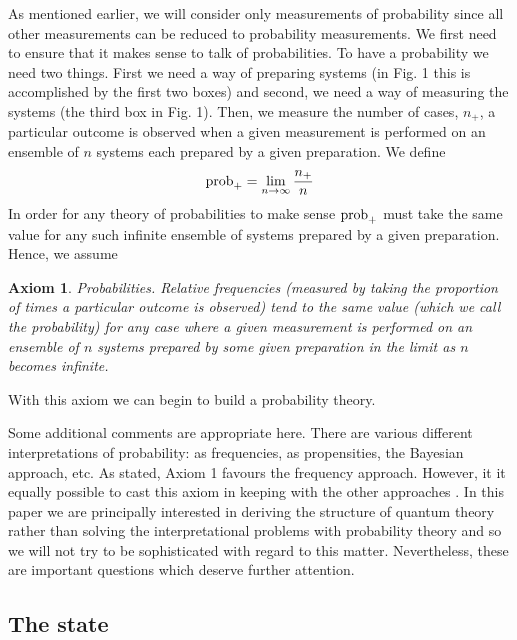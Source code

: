 \documentclass[10pt,twocolumn]{article}
\newtheorem{axiom}{Axiom}
\begin{document}
As mentioned earlier, we will consider only measurements of probability
since all other measurements can be reduced to probability measurements.
We first need to ensure that it makes sense to talk of probabilities. To
have a probability we need two things.  First we need a way of preparing
systems (in Fig. 1 this is accomplished by the first two boxes) and
second, we need a way of measuring the systems (the third box in Fig.
1).  Then, we measure the number of cases, $n_+$, a particular outcome is
observed when a given measurement is performed on an ensemble of $n$
systems each prepared by a given preparation.  We define
\begin{equation}
{\rm prob}_+ = \lim_{n\rightarrow {\rm \infty}} {n_+\over n}
\end{equation}
In order for any theory of probabilities to make sense ${\rm prob}_+$ must take the
same value for any such infinite ensemble of systems prepared by a given
preparation.  Hence, we assume

\begin{axiom} {\rm Probabilities.}  Relative frequencies
(measured by taking the proportion of times a particular outcome is observed)
tend to the same value (which we call the probability) for any case
where a given measurement is performed on an ensemble of $n$ systems
prepared by some given preparation in the limit as $n$ becomes infinite.
\end{axiom}

With this axiom we can begin to build a probability theory.

Some additional comments are appropriate here.  There are various
different interpretations of probability: as frequencies, as
propensities, the Bayesian approach, etc.  As stated, Axiom 1 favours
the frequency approach.  However, it it equally possible to
cast this axiom in keeping with the other approaches \cite{schack}.
In this paper we are principally interested in deriving the structure of
quantum theory rather than solving the interpretational problems with
probability theory and so we will not try to be sophisticated with regard to
this matter.  Nevertheless, these are important questions which deserve
further attention.

\subsection{The state}
\end{document}
